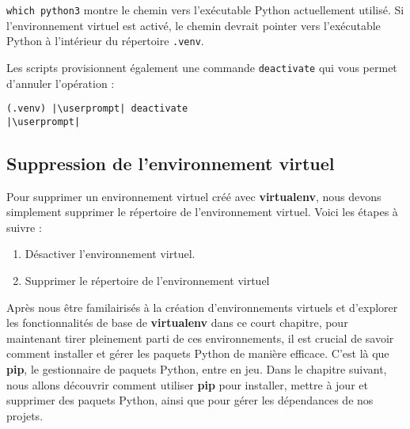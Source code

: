\texttt{which python3} montre le chemin vers l'exécutable Python actuellement utilisé. Si l'environnement virtuel est activé, le chemin devrait pointer vers l'exécutable Python à l'intérieur du répertoire \texttt{.venv}.

Les scripts provisionnent également une commande \texttt{deactivate} qui vous permet d'annuler l'opération :
\begin{lstlisting}[style=bash]
(.venv) |\userprompt| deactivate
|\userprompt|
\end{lstlisting}

\subsection*{Suppression de l'environnement virtuel}
Pour supprimer un environnement virtuel créé avec \textbf{virtualenv}, nous devons simplement supprimer le répertoire de l'environnement virtuel. Voici les étapes à suivre :
\begin{enumerate}
    \item Désactiver l'environnement virtuel.
    \item Supprimer le répertoire de l'environnement virtuel 
\end{enumerate}

\begin{center}
\end{center}

Après nous être familairisés à la création d'environnements virtuels et d'explorer les fonctionnalités de base de \textbf{virtualenv} dans ce court chapitre, pour maintenant tirer pleinement parti de ces environnements, il est crucial de savoir comment installer et gérer les paquets Python de manière efficace. C'est là que \textbf{pip}, le gestionnaire de paquets Python, entre en jeu. Dans le chapitre suivant, nous allons découvrir comment utiliser \textbf{pip} pour installer, mettre à jour et supprimer des paquets Python, ainsi que pour gérer les dépendances de nos projets. 
